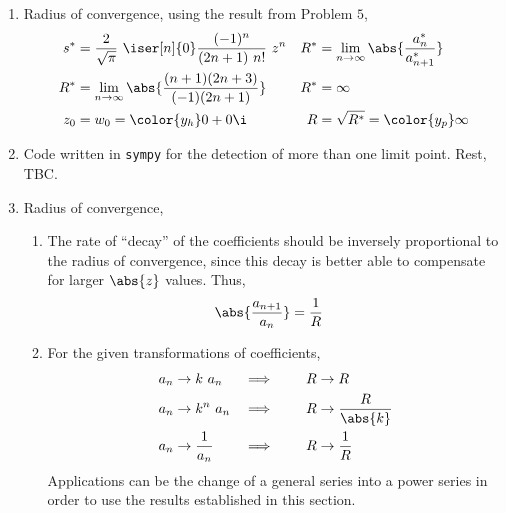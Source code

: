 \begin{enumerate}
    \item Radius of convergence, using the result from Problem $ 5 $,
          \begin{align}
              s^*   & = \frac{2}{\sqrt{\pi}}\ \iser[n]{0}
              \frac{(-1)^n}{(2n+1)\ n!}
              \ z^n &
              R^*   & = \lim_{n \to \infty} \abs{\frac{a_n^*}{a_{n+1}^*}}          \\
              R^*   & = \lim_{n \to \infty} \abs{\frac{(n+1)(2n+3)}{(-1)(2n+1)}} &
              R^*   & = \infty                                                     \\
              z_0   & = w_0 = \color{y_h} 0 + 0 \i                               &
              R     & = \sqrt{R^*} = \color{y_p} \infty
          \end{align}

    \item Code written in \texttt{sympy} for the detection of more than one limit
          point. Rest, TBC.

    \item Radius of convergence,
          \begin{enumerate}
              \item The rate of ``decay'' of the coefficients should be inversely
                    proportional to the radius of convergence, since this decay is better able
                    to compensate for larger $ \abs{z} $ values. Thus,
                    \begin{align}
                        \abs{\frac{a_{n+1}}{a_n}} & = \frac{1}{R}
                    \end{align}

              \item For the given transformations of coefficients,
                    \begin{align}
                        a_n               & \to k\ a_n            &
                        \implies \qquad R & \to R                   \\
                        a_n               & \to k^n\ a_n          &
                        \implies \qquad R & \to \frac{R}{\abs{k}}   \\
                        a_n               & \to \frac{1}{a_n}     &
                        \implies \qquad R & \to \frac{1}{R}         \\
                    \end{align}
                    Applications can be the change of a general series into a power series
                    in order to use the results established in this section.
          \end{enumerate}


\end{enumerate}

